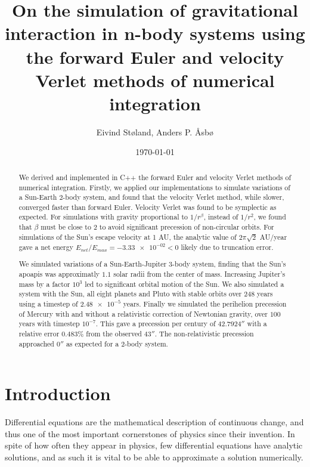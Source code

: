 \documentclass[reprint,english,notitlepage]{revtex4-1}  %
\begin{document}
\title{On the simulation of gravitational interaction in n-body systems using the forward Euler and velocity Verlet methods of numerical integration}   %
\author{Eivind Støland, Anders P. Åsbø}               %
\date{\today}                             %
\noaffiliation                            %

\begin{abstract}
We derived and implemented in C++ the forward Euler and velocity Verlet methods of numerical integration. Firstly, we applied our implementations to simulate variations of a Sun-Earth \(2\)-body system, and found that the velocity Verlet method, while slower, converged faster than forward Euler. Velocity Verlet was found to be symplectic as expected. For simulations with gravity proportional to \(1/r^{\beta}\), instead of \(1/r^2\), we found that \(\beta\) must be close to \(2\) to avoid significant precession of non-circular orbits. For simulations of the Sun's escape velocity at 1 AU, the analytic value of \(2\pi\sqrt{2}\) AU/year gave a net energy \(E_{net}/E_{max} = \num{-3.33e-02} < 0\) likely due to truncation error.

We simulated variations of a Sun-Earth-Jupiter \(3\)-body system, finding that the Sun's apoapis was approximatly \(1.1\) solar radii from the center of mass. Increasing Jupiter's mass by a factor \(10^{3}\) led to significant orbital motion of the Sun. We also simulated a system with the Sun, all eight planets and Pluto with stable orbits over \(248\) years using a timestep of \(\num{2.48e-5}\) years. Finally we simulated the perihelion precession of Mercury with and without a relativistic correction of Newtonian gravity, over \(100\) years with timestep \(10^{-7}\). This gave a precession per century of \(42.7924''\) with a relative error \(0.483 \%\) from the observed \(43''\). The non-relativistic precession approached \(0''\) as expected for a \(2\)-body system.
\end{abstract}

\maketitle                                %


\tableofcontents

\section{Introduction} \label{sec:I}
Differential equations are the mathematical description of continuous change, and thus one of the most important cornerstones of physics since their invention. In spite of how often they appear in physics, few differential equations have analytic solutions, and as such it is vital to be able to approximate a solution numerically.
\end{document}
